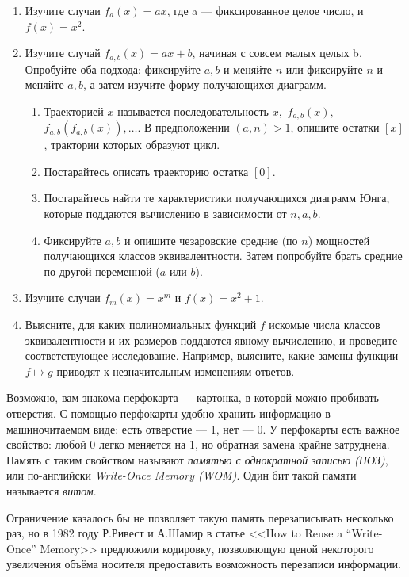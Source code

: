 \begin{enumerate}
\item Изучите случаи $f_a(x)=ax$, где a --- фиксированное целое число, и $f(x)=x^2$.
\item Изучите случай $f_{a, b}(x) = ax+b$, начиная с совсем малых целых b. Опробуйте оба подхода: фиксируйте $a,b$ и меняйте $n$ или фиксируйте $n$ и меняйте $a,b$, а затем изучите форму получающихся диаграмм.
\begin{enumerate}
\item Траекторией $x$ называется последовательность $x,$ $f_{a,b}(x),$ $f_{a,b}(f_{a,b}(x)), \ldots$. В предположении $(a,n) > 1$, опишите остатки $[x]$, трактории которых образуют цикл.
\item Постарайтесь описать траекторию остатка $[0]$.
\item Постарайтесь найти те характеристики получающихся диаграмм Юнга, которые поддаются вычислению в зависимости от $n,a,b$.
\item Фиксируйте $a,b$ и опишите чезаровские средние (по $n$) мощностей получающихся классов эквивалентности. Затем попробуйте брать средние по другой переменной ($a$ или $b$).
\end{enumerate}
\item Изучите случаи $f_m(x) = x^m$ и $f(x) = x^2+1$.
\item Выясните, для каких полиномиальных функций $f$ искомые числа классов эквивалентности и их размеров поддаются явному вычислению, и проведите соответствующее исследование. Например, выясните, какие замены функции $f \mapsto g$ приводят к незначительным изменениям ответов.
\end{enumerate}

\bigskip


\medskip

Возможно, вам знакома перфокарта --- картонка, в которой можно пробивать отверстия. С помощью перфокарты удобно хранить информацию в машиночитаемом виде: есть отверстие --- 1, нет --- 0. У перфокарты есть важное свойство: любой 0 легко меняется на 1, но обратная замена крайне затруднена. Память с таким свойством называют \emph{памятью с однократной записью (ПОЗ)}, или по-английски \emph{Write-Once Memory (WOM)}. Один бит такой памяти называется \emph{витом}.

Ограничение казалось бы не позволяет такую память перезаписывать несколько
раз, но в 1982 году Р.Ривест и А.Шамир в статье <<How to Reuse a ``Write-Once'' Memory>> предложили кодировку, позволяющую ценой некоторого увеличения объёма носителя предоставить возможность перезаписи информации.
                                                     
